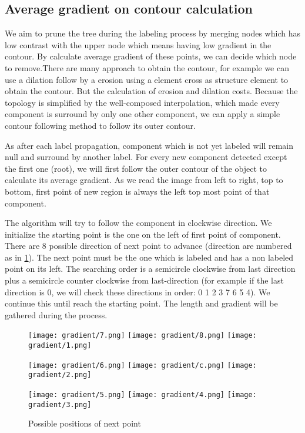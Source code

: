 \subsection{Average gradient on contour calculation}
\par We aim to prune the tree during the labeling process by merging nodes which has low contrast with the upper node which means having low gradient in the contour. By calculate average gradient of these points, we can decide which node to remove.There are many approach to obtain the contour, for example we can use a dilation follow by a erosion using a element cross as structure element to obtain the contour. But the calculation of erosion and dilation costs. Because the topology is simplified by the well-composed interpolation, which made every component is surround by only one other component, we can apply a simple contour following method to follow its outer contour.
\par As after each label propagation, component which is not yet labeled will remain null and surround by another label. For every new component detected except the first one (root), we will first follow the outer contour of the object to calculate its average gradient. As we read the image from left to right, top to bottom, first point of new region is always the left top most point of that component. 

The algorithm will try to follow the component in clockwise direction. We initialize the starting point is the one on the left of first point of component. There are 8 possible direction of next point to advance (direction are numbered as in \ref{directionToSearch}). The next point must be the one which is labeled and has a non labeled point on its left. The searching order is a semicircle clockwise from last direction plus a semicircle counter clockwise from last-direction (for example if the last direction is 0, we will check these directions in order: 0 1 2 3 7 6 5 4). We continue this until reach the starting point. The length and gradient will be gathered during the process. 

\begin{figure}
\texttt{[image: gradient/7.png]}
\texttt{[image: gradient/8.png]}
\texttt{[image: gradient/1.png]}
\centering

\texttt{[image: gradient/6.png]}
\texttt{[image: gradient/c.png]}
\texttt{[image: gradient/2.png]}
\centering

\texttt{[image: gradient/5.png]}
\texttt{[image: gradient/4.png]}
\texttt{[image: gradient/3.png]}
\centering
\caption{Possible positions of next point}
\label{directionToSearch}
\end{figure}


